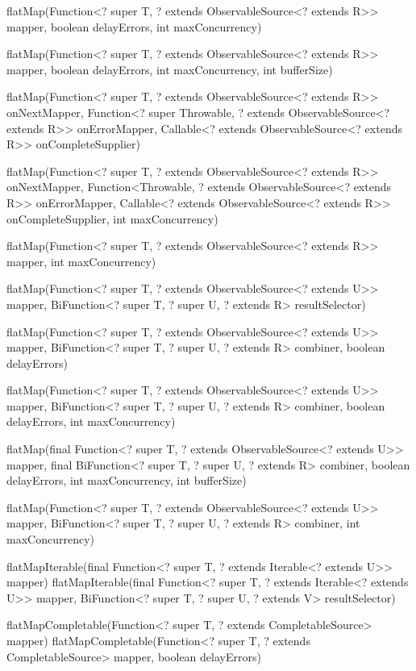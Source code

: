 \documentclass{book}
\begin{document}
{flatMap(Function<? super T, ? extends ObservableSource<? extends R>> mapper, boolean delayErrors, int maxConcurrency)

flatMap(Function<? super T, ? extends ObservableSource<? extends R>> mapper,
            boolean delayErrors, int maxConcurrency, int bufferSize)

flatMap(Function<? super T, ? extends ObservableSource<? extends R>> onNextMapper,
            Function<? super Throwable, ? extends ObservableSource<? extends R>> onErrorMapper,
            Callable<? extends ObservableSource<? extends R>> onCompleteSupplier)

flatMap(Function<? super T, ? extends ObservableSource<? extends R>> onNextMapper,
            Function<Throwable, ? extends ObservableSource<? extends R>> onErrorMapper,
            Callable<? extends ObservableSource<? extends R>> onCompleteSupplier,
            int maxConcurrency)
            
flatMap(Function<? super T, ? extends ObservableSource<? extends R>> mapper, int maxConcurrency)


flatMap(Function<? super T, ? extends ObservableSource<? extends U>> mapper,
            BiFunction<? super T, ? super U, ? extends R> resultSelector)

flatMap(Function<? super T, ? extends ObservableSource<? extends U>> mapper,
            BiFunction<? super T, ? super U, ? extends R> combiner, boolean delayErrors)

flatMap(Function<? super T, ? extends ObservableSource<? extends U>> mapper,
            BiFunction<? super T, ? super U, ? extends R> combiner, boolean delayErrors, int maxConcurrency)


flatMap(final Function<? super T, ? extends ObservableSource<? extends U>> mapper,
            final BiFunction<? super T, ? super U, ? extends R> combiner, boolean delayErrors, int maxConcurrency, int bufferSize)


flatMap(Function<? super T, ? extends ObservableSource<? extends U>> mapper,
            BiFunction<? super T, ? super U, ? extends R> combiner, int maxConcurrency)

flatMapIterable(final Function<? super T, ? extends Iterable<? extends U>> mapper)
flatMapIterable(final Function<? super T, ? extends Iterable<? extends U>> mapper,
            BiFunction<? super T, ? super U, ? extends V> resultSelector)

flatMapCompletable(Function<? super T, ? extends CompletableSource> mapper)
flatMapCompletable(Function<? super T, ? extends CompletableSource> mapper, boolean delayErrors)


}
\end{document}
